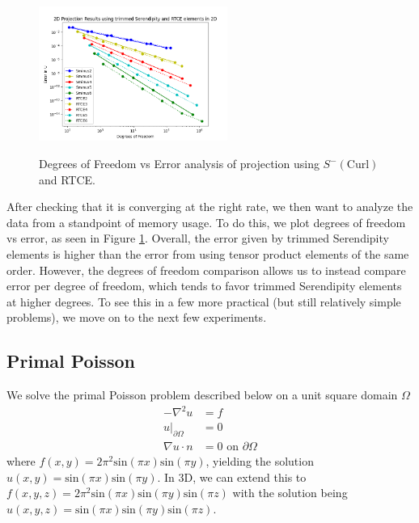 \documentclass[manuscript,screen]{acmart}
\begin{document}
  \begin{figure}[h!]
    \caption{Degrees of Freedom vs Error analysis of projection using $S^-(\text{Curl})$ and RTCE.}
    \includegraphics[width=0.55\textwidth]{2dProjection.png}
    \label{fig:2dProjection}
  \end{figure}
  
  \noindent After checking that it is converging at the right rate, we then want to analyze the data from a standpoint of memory usage.  To do this, we plot degrees of freedom vs error, as seen in Figure \ref{fig:2dProjection}.  Overall, the error given by trimmed Serendipity elements is higher than the error from using tensor product elements of the same order.  However, the degrees of freedom comparison allows us to instead compare error per degree of freedom, which tends to favor trimmed Serendipity elements at higher degrees.  To see this in a few more practical (but still relatively simple problems), we move on to the next few experiments.
  


\newpage
  \subsection{Primal Poisson}
  
\noindent We solve the primal Poisson problem described below on a unit square domain $\Omega$
\begin{align}
    -\nabla^2 u &= f \\
    u\vert_{\partial \Omega} &= 0 \\
    \nabla u \cdot n &= 0 \text{ on } \partial \Omega
\end{align}
where $f(x,y) = 2\pi^2\text{sin}(\pi x)\text{sin}(\pi y) $, yielding the solution $u(x,y) = \text{sin}(\pi x)\text{sin}(\pi y)$. In 3D, we can extend this to $f(x,y,z) = 2\pi^2\text{sin}(\pi x)\text{sin}(\pi y)\text{sin}(\pi z)$ with the solution being $u(x,y,z) = \text{sin}(\pi x)\text{sin}(\pi y)\text{sin}(\pi z)$.  
\end{document}
